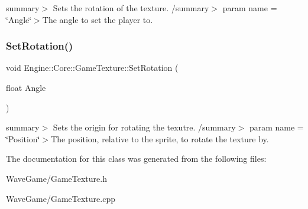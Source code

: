 summary$>$ Sets the rotation of the texture. /summary$>$ param name = \char`\"{}\+Angle\char`\"{}$>$The angle to set the player to.\mbox{\label{class_engine_1_1_core_1_1_game_texture_a5ed78714df6128f09c35c25e2271dc05}} 
\subsubsection{\texorpdfstring{Set\+Rotation()}{SetRotation()}}
{\footnotesize\ttfamily void Engine\+::\+Core\+::\+Game\+Texture\+::\+Set\+Rotation (\begin{DoxyParamCaption}\item[{float}]{Angle }\end{DoxyParamCaption})}

summary$>$ Sets the origin for rotating the texutre. /summary$>$ param name = \char`\"{}\+Position\char`\"{}$>$The position, relative to the sprite, to rotate the texture by.

The documentation for this class was generated from the following files\+:\begin{DoxyCompactItemize}
\item 
Wave\+Game/Game\+Texture.\+h\item 
Wave\+Game/Game\+Texture.\+cpp\end{DoxyCompactItemize}
